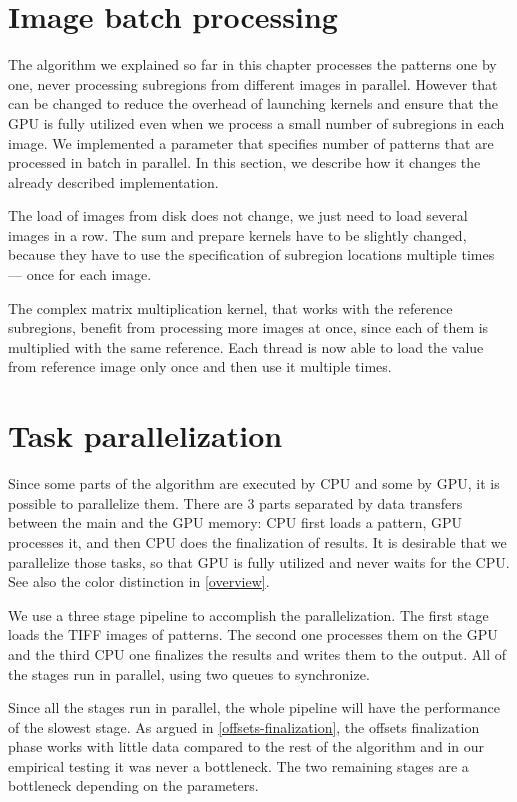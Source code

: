 \section{Image batch processing}
\label{batch-param}

The algorithm we explained so far in this chapter processes the patterns one by one, never processing subregions from different images in parallel. However that can be changed to reduce the overhead of launching kernels and ensure that the GPU is fully utilized even when we process a small number of subregions in each image. We implemented a parameter that specifies number of patterns that are processed in batch in parallel. In this section, we describe how it changes the already described implementation.

The load of images from disk does not change, we just need to load several images in a row. The sum and prepare kernels have to be slightly changed, because they have to use the specification of subregion locations multiple times --- once for each image.

The complex matrix multiplication kernel, that works with the reference subregions, benefit from processing more images at once, since each of them is multiplied with the same reference. Each thread is now able to load the value from reference image only once and then use it multiple times.

\section{Task parallelization}
\label{task-paralelization}


Since some parts of the algorithm are executed by CPU and some by GPU, it is possible to parallelize them. There are 3 parts separated by data transfers between the main and the GPU memory: CPU first loads a pattern, GPU processes it, and then CPU does the finalization of results. It is desirable that we parallelize those tasks, so that GPU is fully utilized and never waits for the CPU. See also the color distinction in \cref{overview}.

We use a three stage pipeline to accomplish the parallelization. The first stage loads the TIFF images of patterns. The second one processes them on the GPU and the third CPU one finalizes the results and writes them to the output. All of the stages run in parallel, using two queues to synchronize.

Since all the stages run in parallel, the whole pipeline will have the performance of the slowest stage. As argued in \cref{offsets-finalization}, the offsets finalization phase works with little data compared to the rest of the algorithm and in our empirical testing it was never a bottleneck. The two remaining stages are a bottleneck depending on the parameters.


